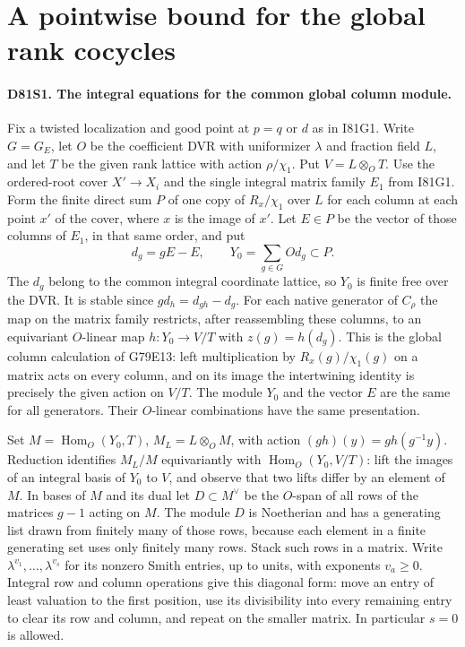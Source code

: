 \section{A pointwise bound for the global rank cocycles}

\paragraph{D81S1. The integral equations for the common global column module.}
Fix a twisted localization and good point at $p=q$ or $d$ as in
I81G1. Write $G=G_E$, let $O$ be the coefficient DVR with uniformizer
$\lambda$ and fraction field $L$, and let $T$ be the given rank
lattice with action $\rho/\chi_1$. Put $V=L\otimes_O T$. Use the
ordered-root cover $X'\to X_i$ and the single integral matrix family
$E_1$ from I81G1. Form the finite direct sum $P$ of one copy of
$R_{x}/\chi_1$ over $L$ for each column at each point $x'$ of the
cover, where $x$ is the image of $x'$. Let $E\in P$ be the vector
of those columns of $E_1$, in that same order, and put
\[
 d_g=gE-E,\qquad Y_0=\sum_{g\in G}O d_g\subset P .
\]
The $d_g$ belong to the common integral coordinate lattice,
so $Y_0$ is finite free over the DVR. It is stable since
$g d_h=d_{gh}-d_g$. For each native generator of $C_\rho$ the map
on the matrix family restricts, after reassembling these columns,
to an equivariant $O$-linear map $h:Y_0\to V/T$ with
$z(g)=h(d_g)$. This is the global column calculation of G79E13:
left multiplication by $R_x(g)/\chi_1(g)$ on a matrix acts on
every column, and on its image the intertwining identity is
precisely the given action on $V/T$. The module $Y_0$ and the
vector $E$ are the same for all generators. Their $O$-linear
combinations have the same presentation.

Set $M=\operatorname{Hom}_O(Y_0,T)$, $M_L=L\otimes_O M$, with
action $(g h)(y)=g h(g^{-1}y)$. Reduction identifies
$M_L/M$ equivariantly with $\operatorname{Hom}_O(Y_0,V/T)$:
lift the images of an integral basis of $Y_0$ to $V$, and observe
that two lifts differ by an element of $M$. In bases of $M$ and
its dual let $D\subset M^\vee$ be the $O$-span of all rows of the
matrices $g-1$ acting on $M$. The module $D$ is Noetherian and
has a generating list drawn from finitely many of those rows,
because each element in a finite generating set uses only finitely
many rows. Stack such rows in a matrix. Write
$\lambda^{v_1},\ldots,\lambda^{v_s}$ for its nonzero Smith
entries, up to units, with exponents $v_a\ge0$.
Integral row and column operations give this diagonal form:
move an entry of least valuation to the first position, use its
divisibility into every remaining entry to clear its row and column,
and repeat on the smaller matrix. In particular $s=0$ is allowed.

